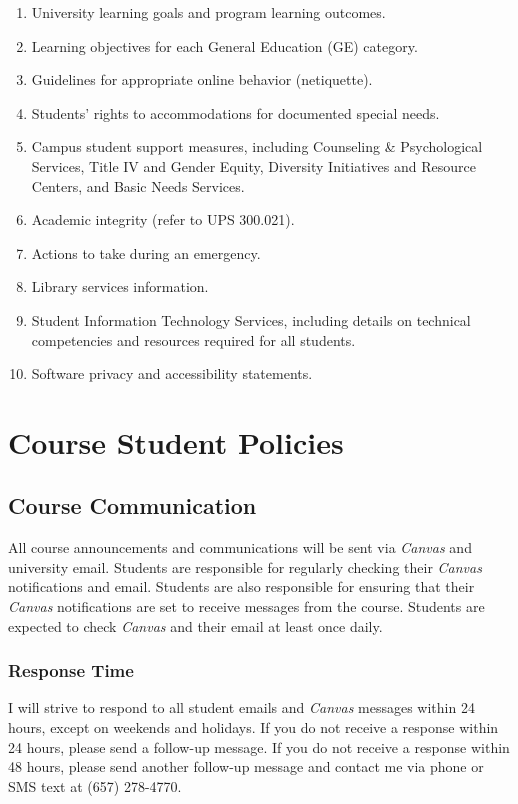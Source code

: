 \documentclass[11pt, letterpaper]{article}
\begin{document}
\begin{enumerate}
    \item   University learning goals and program learning outcomes.
    \item	Learning objectives for each General Education (GE) category.
    \item	Guidelines for appropriate online behavior (netiquette).
    \item	Students’ rights to accommodations for documented special needs.
    \item   Campus student support measures, including Counseling \& Psychological Services, Title IV and Gender Equity, Diversity Initiatives and Resource Centers, and Basic Needs Services.
    \item	Academic integrity (refer to UPS 300.021).
    \item	Actions to take during an emergency.
    \item	Library services information.
    \item	Student Information Technology Services, including details on technical competencies and resources required for all students.
    \item	Software privacy and accessibility statements.
\end{enumerate}

\section{Course Student Policies}

\subsection*{Course Communication}
All course announcements and communications will be sent via \emph{Canvas} and university email. Students are responsible for regularly checking their \emph{Canvas} notifications and email. Students are also responsible for ensuring that their \emph{Canvas} notifications are set to receive messages from the course. Students are expected to check \emph{Canvas} and their email at least once daily.

\subsubsection*{Response Time}I will strive to respond to all student emails and \emph{Canvas} messages within 24 hours, except on weekends and holidays. If you do not receive a response within 24 hours, please send a follow-up message. If you do not receive a response within 48 hours, please send another follow-up message and contact me via phone or SMS text at (657) 278-4770.
\end{document}

